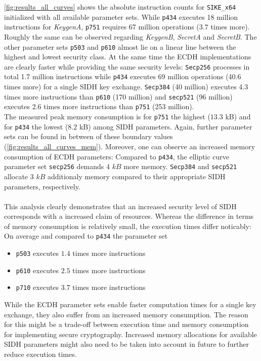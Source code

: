 \autoref{fig:results_all_curves} shows the absolute instruction counts for \texttt{SIKE\_x64} initialized with all available parameter sets. While \texttt{p434} executes 18 million instructions for \textit{KeygenA}, \texttt{p751} requires 67 million operations ($3.7$ times more). Roughly the same can be observed regarding \textit{KeygenB}, \textit{SecretA} and \textit{SecretB}. The other parameter sets \texttt{p503} and \texttt{p610} almost lie on a linear line between the highest and lowest security class. At the same time the \gls{ECDH} implementations are clearly faster while providing the same security levels: \texttt{Secp256} processes in total 1.7 million instructions while \texttt{p434} executes 69 million operations (40.6 times more) for a single \gls{SIDH} key exchange. \texttt{Secp384} (40 million) executes 4.3 times more instructions than \texttt{p610} (170 million) and \texttt{secp521} (96 million) executes 2.6 times more instructions than \texttt{p751} (253 million).\\
The measured peak memory consumption is for \texttt{p751} the highest ($13.3$ \gls{kB}) and for \texttt{p434} the lowest ($8.2$ \gls{kB}) among \gls{SIDH} parameters. Again, further parameter sets can be found in between of these boundary values (\autoref{fig:results_all_curves_mem}). Moreover, one can observe an increased memory consumption of \gls{ECDH} parameters: Compared to \texttt{p434}, the elliptic curve parameter set \texttt{secp256} demands 4 $kB$ more memory. \texttt{Secp384} and \texttt{secp521} allocate 3 $kB$ additionaly memory compared to their appropriate \gls{SIDH} parameters, respectively.\\\\
This analysis clearly demonstrates that an increased security level of \gls{SIDH} corresponds with a increased claim of resources. Whereas the difference in terms of memory consumption is relatively small, the execution times differ noticably: On average and compared to \texttt{p434} the parameter set
\begin{itemize}
\itemsep0em 
\item \texttt{p503} executes $1.4$ times more instructions
\item \texttt{p610} executes $2.5$ times more instructions
\item \texttt{p710} executes $3.7$ times more instructions
\end{itemize}
While the \gls{ECDH} parameter sets enable faster computation times for a single key exchange, they also suffer from an increased memory consumption. The reason for this might be a trade-off between execution time and memory consumption for implementing secure cryptography. Increased memory allocations for available \gls{SIDH} parameters might also need to be taken into account in future to further reduce execution times.

